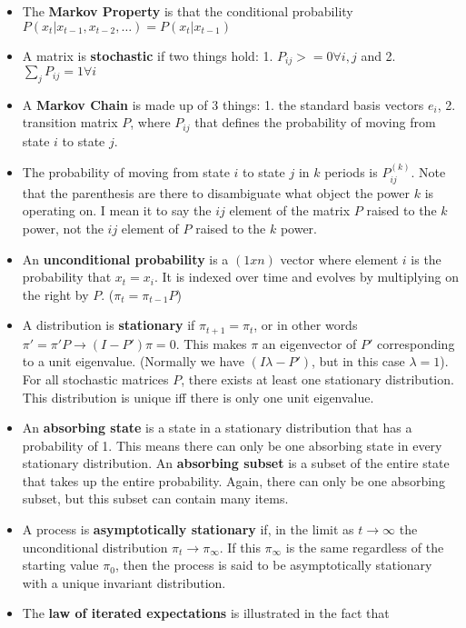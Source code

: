 \documentclass[11pt]{article}
\begin{document}
\begin{itemize}
\item The \textbf{Markov Property} is that the conditional probability
  $P(x_t|x_{t-1},x_{t-2}, \dots) = P(x_t|x_{t-1})$
\item A matrix is \textbf{stochastic} if two things hold: 1. $P_{ij} >= 0 \forall
  i, j$ and 2. $\sum_j P_{ij}=1 \forall i$
\item A \textbf{Markov Chain} is made up of 3 things: 1. the standard basis
  vectors $e_i$, 2. transition matrix $P$, where $P_{ij}$ that defines
  the probability of moving from state $i$ to state $j$.
\item The probability of moving from state $i$ to state $j$ in $k$ periods
  is $P^{(k)}_{ij}$. Note that the parenthesis are there to
  disambiguate what object the power $k$ is operating on. I mean it to
  say the $ij$ element of the matrix $P$ raised to the $k$ power, not
  the $ij$ element of $P$ raised to the $k$ power.
\item An \textbf{unconditional probability} is a $(1 x n)$ vector where element
  $i$ is the probability that $x_t = x_i$. It is indexed over time and
  evolves by multiplying on the right by $P$. ($\pi_t = \pi_{t-1}P$)
\item A distribution is \textbf{stationary} if $\pi_{t+1}=\pi_t$, or in other
  words $\pi' = \pi' P \rightarrow (I-P')\pi = 0$. This makes $\pi$ an
  eigenvector of $P'$ corresponding to a unit eigenvalue. (Normally we
  have $(I\lambda - P')$, but in this case $\lambda=1$). For all
  stochastic matrices $P$, there exists at least one stationary
  distribution. This distribution is unique iff there is only one unit
  eigenvalue.
\item An \textbf{absorbing state} is a state in a stationary distribution that
  has a probability of 1. This means there can only be one absorbing
  state in every stationary distribution. An \textbf{absorbing subset} is a
  subset of the entire state that takes up the entire
  probability. Again, there can only be one absorbing subset, but this
  subset can contain many items.
\item A process is \textbf{asymptotically stationary} if, in the limit as $t
  \rightarrow \infty$ the unconditional distribution $\pi_t
  \rightarrow \pi_{\infty}$. If this $\pi_{\infty}$ is the same
  regardless of the starting value $\pi_0$, then the process is said
  to be asymptotically stationary with a unique invariant
  distribution.
\item The \textbf{law of iterated expectations} is illustrated in the fact that

\end{itemize}
\end{document}
